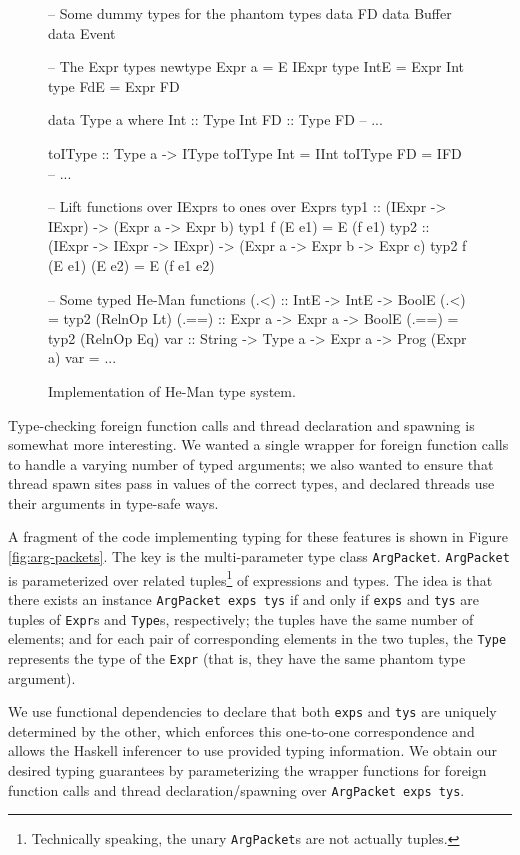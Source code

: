 \documentclass[preprint]{sigplanconf}
\renewcommand{\t}{\texttt}
\begin{document}
\begin{figure}[ht]
\centering
\begin{code}
-- Some dummy types for the phantom types
data FD
data Buffer
data Event

-- The Expr types
newtype Expr a = E IExpr
type IntE = Expr Int
type FdE = Expr FD

data Type a where
  Int :: Type Int
  FD :: Type FD
  -- ...

toIType :: Type a -> IType
toIType Int = IInt
toIType FD = IFD
-- ...

-- Lift functions over IExprs to ones over Exprs
typ1 :: (IExpr -> IExpr) -> (Expr a -> Expr b)
typ1 f (E e1) = E (f e1)
typ2 :: (IExpr -> IExpr -> IExpr) ->
        (Expr a -> Expr b -> Expr c)
typ2 f (E e1) (E e2) = E (f e1 e2)

-- Some typed He-Man functions
(.<) :: IntE -> IntE -> BoolE
(.<) = typ2 (RelnOp Lt)
(.==) :: Expr a -> Expr a -> BoolE
(.==) = typ2 (RelnOp Eq)
var :: String -> Type a -> Expr a -> Prog (Expr a)
var = ...
\end{code}
\caption{Implementation of He-Man type system.}
\label{fig:types}
\end{figure}

Type-checking foreign function calls and thread declaration and spawning is
somewhat more interesting. We wanted a single wrapper for foreign function calls
to handle a varying number of typed arguments; we also wanted to ensure that
thread spawn sites pass in values of the correct types, and declared threads use
their arguments in type-safe ways.

A fragment of the code implementing typing for these features is shown
in Figure \ref{fig:arg-packets}. The key is the multi-parameter type
class \t{ArgPacket}. \t{ArgPacket} is parameterized over related
tuples\footnote{Technically speaking, the unary \t{ArgPacket}s are
not actually tuples.} of expressions and types. The idea is that
there exists an instance \t{ArgPacket exps tys} if and only if
\t{exps} and \t{tys} are tuples of \t{Expr}s and \t{Type}s,
respectively; the tuples have the same number of elements; and for
each pair of corresponding elements in the two tuples, the \t{Type}
represents the type of the \t{Expr} (that is, they have the same
phantom type argument).

We use functional dependencies to declare that both \t{exps} and \t{tys} are
uniquely determined by the other, which enforces this one-to-one correspondence
and allows the Haskell inferencer to use provided typing information. We obtain
our desired typing guarantees by parameterizing the wrapper functions for
foreign function calls and thread declaration/spawning over \t{ArgPacket exps tys}.
\end{document}

